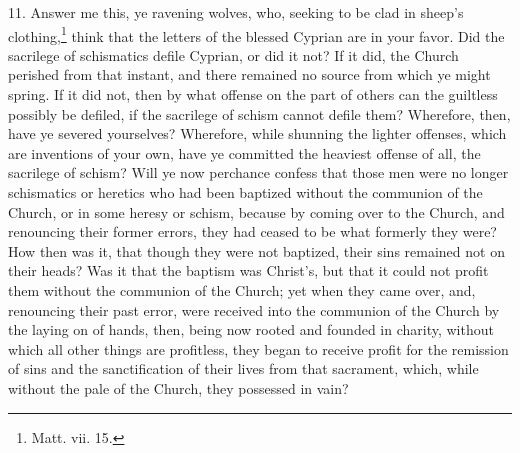 11. Answer me this, ye ravening wolves, who, seeking to be clad in sheep’s clothing,\footnote{\par  Matt. vii. 15.} think that the letters of the blessed Cyprian are in your favor. Did the sacrilege of schismatics defile Cyprian, or did it not? If it did, the Church perished from that instant, and there remained no source from which ye might spring. If it did not, then by what offense on the part of others can the guiltless possibly be defiled, if the sacrilege of schism cannot defile them? Wherefore, then, have ye severed yourselves? Wherefore, while shunning the lighter offenses, which are inventions of your own, have ye committed the heaviest offense of all, the sacrilege of schism? Will ye now perchance confess that those men were no longer schismatics or heretics who had been baptized without the communion of the Church, or in some heresy or schism, because by coming over to the Church, and renouncing their former errors, they had ceased to be what formerly they were? How then was it, that though they were not baptized, their sins remained not on their heads? Was it that the baptism was Christ’s, but that it could not profit them without the communion of the Church; yet when they came over, and, renouncing their past error, were received into the communion of the Church by the laying on of hands, then, being now rooted and founded in charity, without which all other things are profitless, they began to receive profit for the remission of sins and the sanctification of their lives from that sacrament, which, while without the pale of the Church, they possessed in vain?


